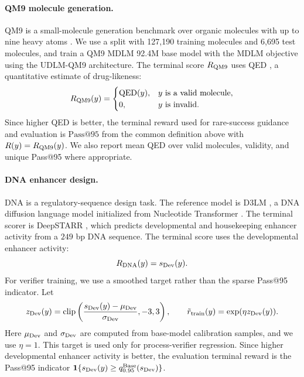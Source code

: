 \documentclass{article}
\numberwithin{theorem}{section}
\numberwithin{proposition}{section}
\numberwithin{corollary}{section}
\numberwithin{lemma}{section}
\numberwithin{conjecture}{section}
\numberwithin{remark}{section}
\numberwithin{definition}{section}
\numberwithin{assumption}{section}
\numberwithin{example}{section}
\begin{document}
\paragraph{QM9 molecule generation.}
QM9 is a small-molecule generation benchmark over organic molecules with up to nine heavy atoms \citep{ramakrishnan2014quantum}. We use a split with 127,190 training molecules and 6,695 test molecules, and train a QM9 MDLM 92.4M base model with the MDLM objective using the UDLM-QM9 architecture. The terminal score \(R_{\rm QM9}\) uses QED \cite{bickerton2012quantifying}, a quantitative estimate of drug-likeness:
\begin{equation*}
R_{\rm QM9}(y) =
    \begin{cases}
    \mathrm{QED}(y), & y\text{ is a valid molecule},\\
    0, & y\text{ is invalid}.
    \end{cases}
\end{equation*}
Since higher QED is better, the terminal reward used for rare-success guidance and evaluation is $\mathrm{Pass@95}$ from the common definition above with $R(y)=R_{\rm QM9}(y)$. We also report mean QED over valid molecules, validity, and unique Pass@95 where appropriate.

\paragraph{DNA enhancer design.}
DNA is a regulatory-sequence design task. The reference model is D3LM \citep{yang2026d3lmdiscretednadiffusion}, a DNA diffusion language model initialized from Nucleotide Transformer \citep{dallatorre2025nucleotide}. The terminal scorer is DeepSTARR \citep{dealmeida2022deepstarr}, which predicts developmental and housekeeping enhancer activity from a $249$ bp DNA sequence. The terminal score uses the developmental enhancer activity:
\begin{equation*}
R_{\rm DNA}(y)=s_{\rm Dev}(y).
\end{equation*}
For verifier training, we use a smoothed target rather than the sparse Pass@95 indicator. Let
\begin{equation*}
    z_{\rm Dev}(y)
=
    \mathrm{clip}\left(
    \frac{s_{\rm Dev}(y)-\mu_{\rm Dev}}{\sigma_{\rm Dev}},
    -3,3
    \right),
    \qquad
    \tilde r_{\rm train}(y)=\exp(\eta z_{\rm Dev}(y)).
\end{equation*}
Here \(\mu_{\rm Dev}\) and \(\sigma_{\rm Dev}\) are computed from base-model calibration samples, and we use \(\eta=1\). This target is used only for process-verifier regression. Since higher developmental enhancer activity is better, the evaluation terminal reward is the Pass@95 indicator \(\mathbf 1\{s_{\rm Dev}(y)\ge q_{0.95}^{\rm Base}(s_{\rm Dev})\}\).
\end{document}
